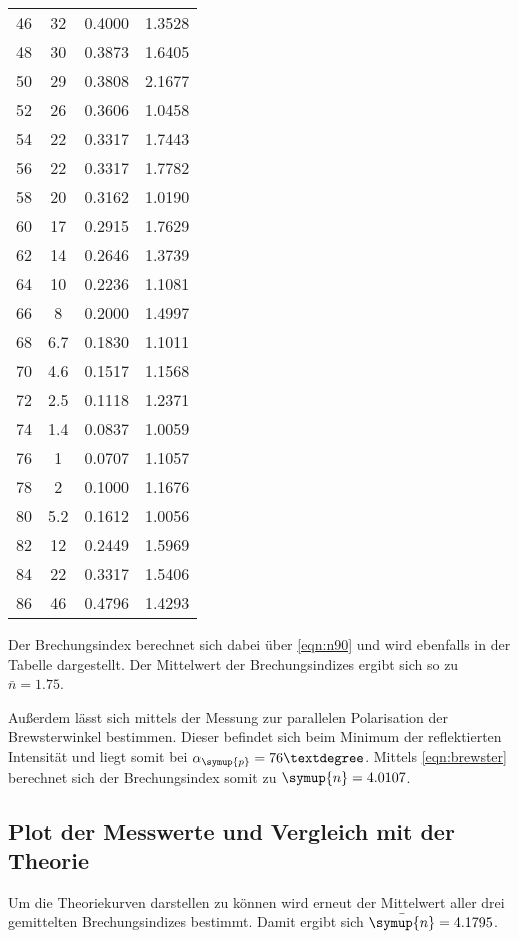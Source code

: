 \begin{table}
\begin{tabular}{c c c c}
        \midrule
        46 & 32 & 0.4000 & 1.3528 \\
        48 & 30 & 0.3873 & 1.6405 \\
        50 & 29 & 0.3808 & 2.1677 \\
         52 & 26 & 0.3606 & 1.0458 \\
        54 & 22 & 0.3317 & 1.7443 \\
        56 & 22 & 0.3317 & 1.7782 \\
        58 & 20 & 0.3162 & 1.0190 \\
        60 & 17 & 0.2915 & 1.7629 \\
        62 & 14 & 0.2646 & 1.3739 \\
        64 & 10 & 0.2236 & 1.1081 \\
        66 & 8 & 0.2000 & 1.4997 \\
       68 & 6.7 & 0.1830 & 1.1011 \\
       70 & 4.6 & 0.1517 & 1.1568 \\
       72 & 2.5 & 0.1118 & 1.2371 \\
       74 & 1.4 & 0.0837 & 1.0059 \\
        76 & 1 & 0.0707 & 1.1057 \\
        78 & 2 & 0.1000 & 1.1676 \\
       80 & 5.2 & 0.1612 & 1.0056 \\
        82 & 12 & 0.2449 & 1.5969 \\
        84 & 22 & 0.3317 & 1.5406 \\
        86 & 46 & 0.4796 & 1.4293\\
        \bottomrule
    \end{tabular}
    \label{tab:Pol90}
\end{table}
Der Brechungsindex berechnet sich dabei über \autoref{eqn:n90} und wird ebenfalls in der Tabelle dargestellt. 
Der Mittelwert der Brechungsindizes ergibt sich so zu $\bar{n}= 1.75$.

Außerdem lässt sich mittels der Messung zur parallelen Polarisation der Brewsterwinkel bestimmen. Dieser befindet sich beim Minimum der 
reflektierten Intensität und liegt somit bei $\alpha_{\symup{p}} = 76°$. Mittels \autoref{eqn:brewster} berechnet sich der Brechungsindex somit zu  
$\symup{n} = 4.0107$.

\subsection{Plot der Messwerte und Vergleich mit der Theorie}
Um die Theoriekurven darstellen zu können wird erneut der Mittelwert aller drei gemittelten Brechungsindizes bestimmt. Damit ergibt sich 
$\bar{\symup{n}} = 4.1795$.

